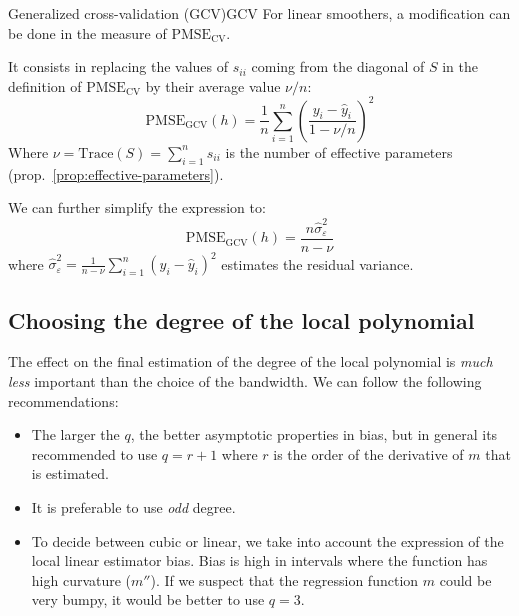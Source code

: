 \begin{definition}{Generalized cross-validation (GCV)}{GCV}
    For linear smoothers, a modification can be done in the measure
    of $\text{PMSE}_\text{CV}$.

    It consists in replacing the values of $s_{ii}$ coming
    from the diagonal of $S$ in the definition of
    $\text{PMSE}_\text{CV}$ by their average value $\nu/n$:
    \begin{equation*}
        \text{PMSE}_\text{GCV}(h) = \frac{1}{n} \sum_{i=1}^n \left(
            \frac{y_i - \hat y_i}{1 - \nu/n}
    \right)^2
    \end{equation*}
    Where $\nu = \text{Trace}(S) = \sum_{i=1}^n s_{ii}$ is the number of effective
    parameters (prop.~\ref{prop:effective-parameters}).

    We can further simplify the expression to:
    \begin{equation*}
        \boxed{
        \text{PMSE}_\text{GCV}(h) = \frac{n\hat\sigma_\varepsilon^2}{n - \nu}
        }
    \end{equation*}
    where $\hat\sigma_\varepsilon^2 = \frac{1}{n-\nu}\sum^n_{i=1}\left(y_i - \hat y_i\right)^2$
    estimates the residual variance.
\end{definition}

\subsection{Choosing the degree of the local polynomial}
The effect on the final estimation of the degree of the
local polynomial is \emph{much less} important
than the choice of the bandwidth. We can follow the following
recommendations:
\begin{itemize}
    \item The larger the $q$, the better asymptotic properties in bias,
        but in general its recommended to use $q = r+1$ where $r$ is the
        order of the derivative of $m$ that is estimated.
    \item It is preferable to use \emph{odd} degree.
    \item To decide between cubic or linear, we take into account the
        expression of the local linear estimator bias. Bias is high
        in intervals where the function has high curvature ($m''$).
        If we suspect that the regression function $m$ could be very
        bumpy, it would be better to use $q=3$.
\end{itemize}

